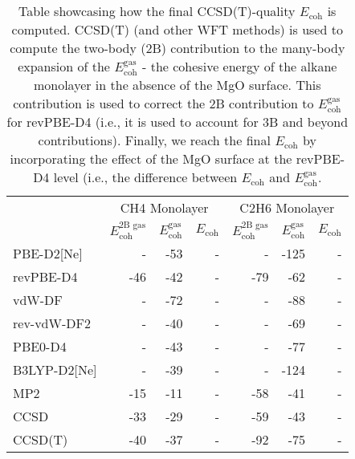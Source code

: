 \begin{table}
\caption{\label{tab:monolayer_ecoh}Table showcasing how the final CCSD(T)-quality $E_\textrm{coh}$ is computed. CCSD(T) (and other WFT methods) is used to compute the two-body (2B) contribution to the many-body expansion of the $E_\textrm{coh}^\textrm{gas}$ - the cohesive energy of the alkane monolayer in the absence of the MgO surface. This contribution is used to correct the 2B contribution to $E_\textrm{coh}^\textrm{gas}$ for revPBE-D4 (i.e., it is used to account for 3B and beyond contributions). Finally, we reach the final $E_\textrm{coh}$ by incorporating the effect of the MgO surface at the revPBE-D4 level (i.e., the difference between $E_\textrm{coh}$ and $E_\textrm{coh}^\textrm{gas}$.}
\begin{adjustbox}{center}
\begin{tabular}{lrrrrrr}
\toprule
 & \multicolumn{3}{c}{CH4 Monolayer} & \multicolumn{3}{c}{C2H6 Monolayer} \\ 
 & $E_\textrm{coh}^\textrm{2B gas}$ & $E_\textrm{coh}^\textrm{gas}$ & $E_\textrm{coh}$ & $E_\textrm{coh}^\textrm{2B gas}$ & $E_\textrm{coh}^\textrm{gas}$ & $E_\textrm{coh}$ \\
\midrule
PBE-D2[Ne] & - & -53 & - & - & -125 & - \\
revPBE-D4 & -46 & -42 & - & -79 & -62 & - \\
vdW-DF & - & -72 & - & - & -88 & - \\
rev-vdW-DF2 & - & -40 & - & - & -69 & - \\
PBE0-D4 & - & -43 & - & - & -77 & - \\
B3LYP-D2[Ne] & - & -39 & - & - & -124 & - \\
MP2 & -15 & -11 & - & -58 & -41 & - \\
CCSD & -33 & -29 & - & -59 & -43 & - \\
CCSD(T) & -40 & -37 & - & -92 & -75 & - \\
\bottomrule
\end{tabular}
\end{adjustbox}
\end{table}